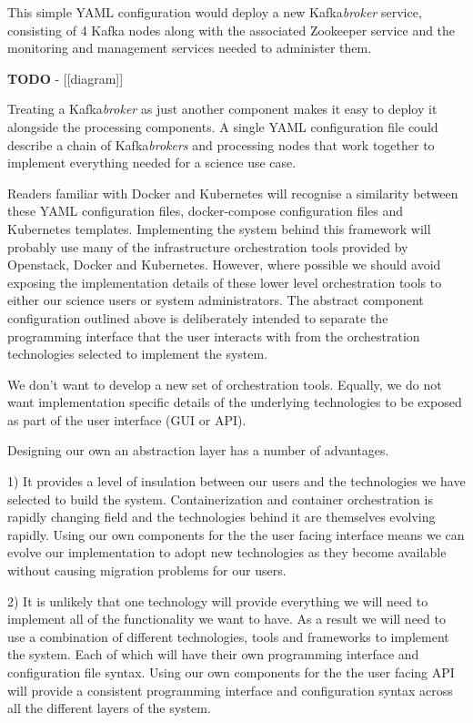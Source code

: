 \documentclass{article}
\newcommand{\yaml} {YAML\xspace}
\newcommand{\docker} {Docker\xspace}
\newcommand{\dockercompose} {docker-compose\xspace}
\newcommand{\kubernetes} {Kubernetes\xspace}
\newcommand{\openstack} {Openstack\xspace}
\newcommand{\kafka} {Kafka\xspace}
\newcommand{\zookeeper} {Zookeeper\xspace}
\newcommand{\kfbroker} {\textit{broker}\xspace}
\newcommand{\kfbrokers} {\textit{brokers}\xspace}
\begin{document}
This simple \yaml configuration would deploy a new \kafka \kfbroker service, consisting of 4 \kafka nodes along with the associated \zookeeper service and the monitoring and management services needed to administer them.

\textbf{TODO} - [[diagram]]

Treating a \kafka \kfbroker as just another component makes it easy to deploy it alongside the processing components. A single \yaml configuration file could describe a chain of \kafka \kfbrokers and processing nodes that work together to implement everything needed for a science use case.

Readers familiar with \docker and \kubernetes will recognise a similarity between these \yaml configuration files, \dockercompose configuration files and \kubernetes templates.
Implementing the system behind this framework will probably use many of the infrastructure orchestration tools provided by \openstack, \docker and \kubernetes.
However, where possible we should avoid exposing the implementation details of
these lower level orchestration tools to either our science users or system administrators. The abstract component configuration outlined above is deliberately intended to separate the programming interface that the user interacts with from the orchestration technologies selected to implement the system.

We don't want to develop a new set of orchestration tools. Equally, we do not want implementation specific details of the underlying technologies to be exposed as part of the user interface (GUI or API).

Designing our own an abstraction layer has a number of advantages.

1) It provides a level of insulation between our users and the technologies we have selected to build the system. Containerization and container orchestration is rapidly changing field and the technologies behind it are themselves evolving rapidly.
Using our own components for the the user facing interface means we can evolve our implementation to adopt new technologies as they become available without causing migration problems for our users.

2) It is unlikely that one technology will provide everything we will need to implement all of the functionality we want to have. As a result we will need to use a combination of different technologies, tools and frameworks to implement the system. Each of which will have their own programming interface and configuration file syntax.
Using our own components for the the user facing API will provide a consistent programming interface and configuration syntax across all the different layers of the system.
\end{document}
